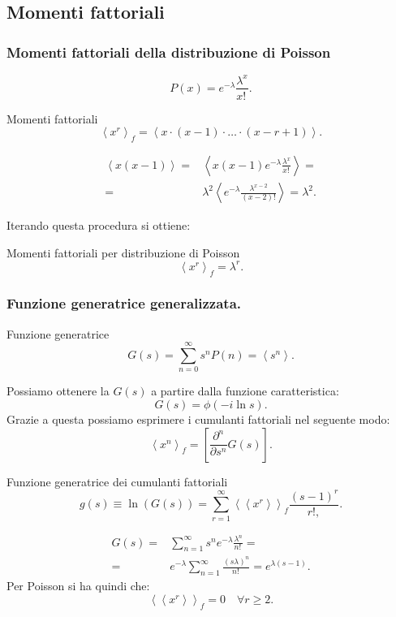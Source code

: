 \subsection{Momenti fattoriali}%
\label{sub:Momenti fattoriali}

\subsubsection{Momenti fattoriali della distribuzione di Poisson}%
\label{subsub:Momenti fattoriali della distribuzione di Poisson}
\[
	P(x) = e^{-\lambda } \frac{\lambda^x}{x!\,}
.\] 
\begin{redbox}{Momenti fattoriali}
    \[
	\left<x^r\right>_f = \left<x\cdot (x-1) \cdot \ldots \cdot (x-r+1) \right>
    .\] 
\end{redbox}
\noindent
\begin{exmp}[Poisson con $r=2$.]
   \[\begin{aligned}
       \left<x\left(x-1\right)\right> =& \left<x\left(x-1\right)e^{-\lambda} \frac{\lambda^x}{x!\,}\right> = \\
       =& \lambda^2\left<e^{-\lambda} \frac{\lambda^{x-2}}{\left(x-2\right)!}\right> = \lambda^2
   .\end{aligned}\]
\end{exmp}
\noindent
Iterando questa procedura si ottiene:
\begin{bluebox}{Momenti fattoriali per distribuzione di Poisson}
 \[
    \left<x^r\right>_f = \lambda^r
.\]    
\end{bluebox}
\noindent

\subsubsection{Funzione generatrice generalizzata.}%
\label{subsub:Funzione generatrice generalizzata.}

\begin{redbox}{Funzione generatrice}
    \[
	G(s) = \sum_{n=0}^{\infty} s^n P(n) = \left<s^n\right>
    .\] 
\end{redbox}
\noindent
Possiamo ottenere la $G(s)$ a partire dalla funzione caratteristica:
\[
    G(s) = \phi (-i\ln s) 
.\] 
Grazie a questa possiamo esprimere i cumulanti fattoriali nel seguente modo:
\[
\left<x^n\right>_f = \left[\frac{\partial^n}{\partial s^n} G(s)\right]
.\] 
\begin{bluebox}{Funzione generatrice dei cumulanti fattoriali}
    \[
	g(s) \equiv \ln (G(s)) = \sum_{r=1}^{\infty} \left<\left<x^r\right>\right>_f \frac{\left(s-1\right)^r}{r!,}
    .\] 
\end{bluebox}
\noindent
\begin{exmp}
    \[\begin{aligned}
	G(s) =& \sum_{n=1}^{\infty} s^n e^{-\lambda} \frac{\lambda^n}{n!\,} =\\
	=& e^{-\lambda}\sum_{n=1}^{\infty} \frac{\left(s\lambda\right)^n}{n!\,} =  e^{\lambda (s-1) }
     .\end{aligned}\]
     Per Poisson si ha quindi che:
     \[
         \left<\left<x^r\right>\right>_f = 0 \quad \forall r \ge  2
     .\] 
\end{exmp}
\noindent

